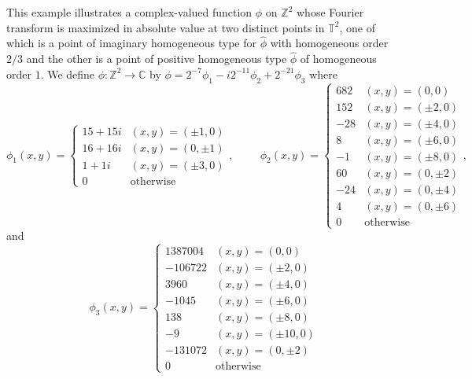 \documentclass[11pt, letter]{book}
\newenvironment{example}
  {\pushQED{\qed}\renewcommand{\qedsymbol}{$\triangle$}\examplex}
  {\popQED\endexamplex}
\begin{document}



\begin{example}\normalfont
This example illustrates a complex-valued function $\phi$ on $\mathbb{Z}^2$ whose Fourier transform is maximized in absolute value at two distinct points in $\mathbb{T}^2$, one of which is a point of imaginary homogeneous type for $\widehat{\phi}$ with homogeneous order $2/3$ and the other is a point of positive homogeneous type $\widehat{\phi}$ of homogeneous order $1$. We define $\phi: \mathbb{Z}^2 \to \mathbb{C}$ by $\phi=2^{-7}\phi_1-i2^{-11}\phi_2+2^{-21}\phi_3$ where
\begin{equation*}
    \phi_1(x,y)=\begin{cases}
    15 + 15i &(x,y) = (\pm 1,0)\\
    16 + 16i &(x,y) = (0, \pm 1)\\
     1 + 1i &(x,y) = (\pm 3,0)\\
    0 &\mbox{otherwise}
    \end{cases},
    \hspace{1cm}
    \phi_2(x,y) = 
    \begin{cases}
    682 &(x,y) = (0,0)\\
    152  &(x,y) = (\pm 2,0)\\
    -28  &(x,y) = (\pm 4,0)\\
    8 &(x,y) = (\pm 6, 0)\\
    -1 &(x,y) = (\pm 8, 0)\\
    60  &(x,y) = (0, \pm 2)\\
    -24 &(x,y) = (0,\pm 4)\\
    4 &(x,y) = (0,\pm 6)\\
    0 &\mbox{otherwise}
    \end{cases},
\end{equation*}
and
\begin{equation*}
    \phi_3(x,y) = 
    \begin{cases}
    1387004 &(x,y) = (0,0)\\
    -106722 &(x,y) = (\pm 2,0)\\
    3960 &(x,y) = (\pm 4,0)\\
    -1045 &(x,y) = (\pm 6, 0)\\
    138  &(x,y) = (\pm 8, 0)\\
    -9 &(x,y) = (\pm 10, 0)\\
    -131072 &(x,y) = (0, \pm 2)\\
    0 &\mbox{otherwise}

\end{cases}
\end{equation*}
\end{example}
\end{document}
